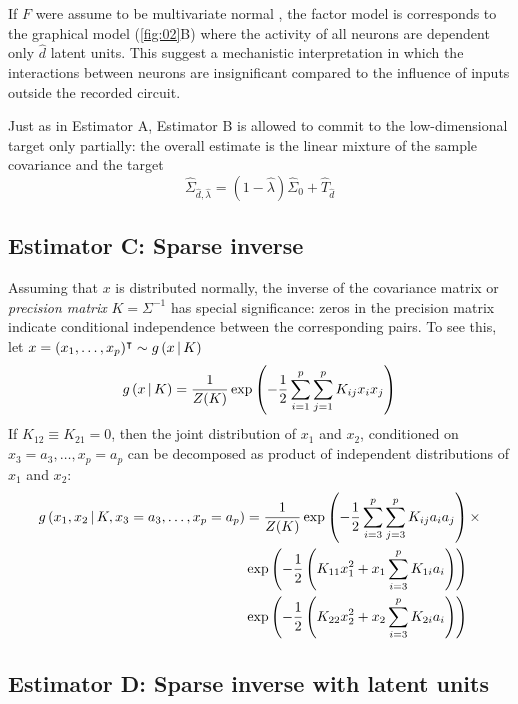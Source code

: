 If $F$ were assume to be multivariate normal , the factor model is corresponds to the graphical model (\ref{fig:02}B) where the activity of all neurons are dependent only $\hat d$ latent units. This suggest a mechanistic interpretation in which the interactions between neurons are insignificant compared to the influence of inputs outside the recorded circuit.

Just as in Estimator A, Estimator B is allowed to commit to the low-dimensional target only partially: the overall estimate is the linear mixture of the sample covariance and the target
\begin{equation}
\hat\Sigma_{\hat d,\hat\lambda} = (1-\hat\lambda)\hat\Sigma_0 + \hat  T_{\hat d}
\end{equation}


\subsection*{Estimator C: Sparse inverse}
Assuming that $x$ is distributed normally, the inverse of the covariance matrix or \emph{precision matrix} $K=\Sigma^{-1}$ has special significance: zeros in the precision matrix indicate conditional independence between the corresponding pairs. To see this, let $x=(x_1,\ldots,x_p)^\intercal \sim g\left(x\,\vert\, K\right)$
\begin{equation}
g\left(x\,\vert\, K\right) = \frac 1 {Z(K)} \exp\left(-\frac 1 2 \sum\limits_{i=1}^p\sum\limits_{j=1}^p  K_{ij} x_i x_j\right)
\end{equation} 
If $K_{12}\equiv K_{21} = 0$, then the joint distribution of $x_1$ and $x_2$, conditioned on $x_3=a_3,\ldots,x_p=a_p$ can be decomposed as product of independent distributions of $x_1$ and $x_2$: 
\begin{equation}
\begin{split}
g\left( x_1, x_2 \,\vert\, K, x_3=a_3,\ldots,x_p=a_p\right) &=
\frac 1 {Z(K)} \exp\left(-\frac 1 2 \sum\limits_{i=3}^p\sum\limits_{j=3}^p  K_{ij} a_i a_j \right)\times
\\
 &  \exp\left( -\frac 1 2\left( K_{11} x_1^2 +  x_1\sum\limits_{i=3}^p K_{1i}a_i \right)  \right)
\\
 &  \exp\left( -\frac 1 2\left( K_{22} x_2^2 +  x_2\sum\limits_{i=3}^p K_{2i}a_i \right)  \right)
\end{split}
\end{equation}


\cite{Dempster:1972,Meinshausen:2006,Friedman:2008}

\subsection*{Estimator D: Sparse inverse with latent units}
\cite{Ma:2013} 

